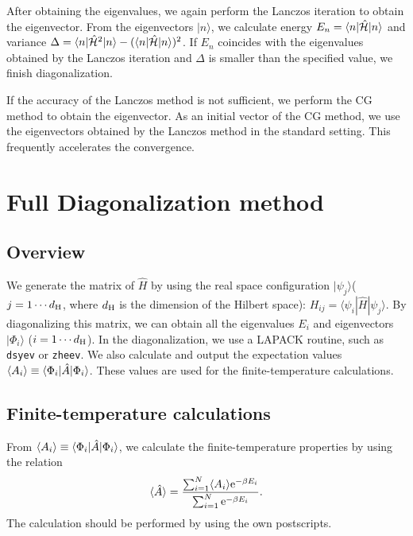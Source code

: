 After obtaining the eigenvalues,
we again perform the Lanczos iteration
to obtain the eigenvector.
From the eigenvectors $|n\rangle$,
we calculate 
energy $E_{n}=\langle n|\hat{\mathcal{H}}|n\rangle $ and
variance $\Delta=\langle n|\hat{\mathcal{H}}^{2}|n\rangle -(\langle n|\hat{\mathcal{H}}|n\rangle)^2$.
If $E_{n}$ coincides with the eigenvalues obtained by the Lanczos iteration and 
$\Delta$ is smaller than the specified value,
we finish diagonalization.

If the accuracy of the Lanczos method is not sufficient,
we perform the CG method to obtain the eigenvector.
As an initial vector of the CG method,
we use the eigenvectors obtained by the Lanczos method in the standard setting.
This frequently accelerates the convergence.
\section{Full Diagonalization method}
\label{Ch:AllDiagonalization}
\subsection{Overview}
We generate the matrix of ${\hat{H}}$ by using the real space configuration 
$| \psi_j \rangle$($j=1\cdots d_{\rm H}$, where $d_{\rm H}$ is the dimension of the Hilbert space): 
$H_{ij}= \langle \psi_i | {\hat H} | \psi_j \rangle$.
By diagonalizing this matrix,
we can obtain all the eigenvalues $E_{i}$ and eigenvectors $|\Phi_i\rangle$ ($i=1 \cdots d_{\rm H}$). 
In the diagonalization, we use a LAPACK routine, such as \verb|dsyev| or \verb|zheev|.
We also calculate and output
the expectation values $\langle A_i\rangle \equiv \langle \Phi_i | {\hat A} | \Phi_i\rangle$.
These values are used for the finite-temperature calculations.

\subsection{Finite-temperature calculations}
From
$\langle A_i\rangle \equiv \langle \Phi_i | {\hat A} | \Phi_i\rangle$,
we calculate the finite-temperature properties by using the relation 
\begin{equation}
\langle {\hat A}\rangle=\frac{\sum_{i=1}^N \langle A_i\rangle {\rm  e}^{-\beta E_i}}{\sum_{i=1}^N{\rm  e}^{-\beta E_i}}.
\end{equation}
The calculation should be performed by using the own postscripts.

